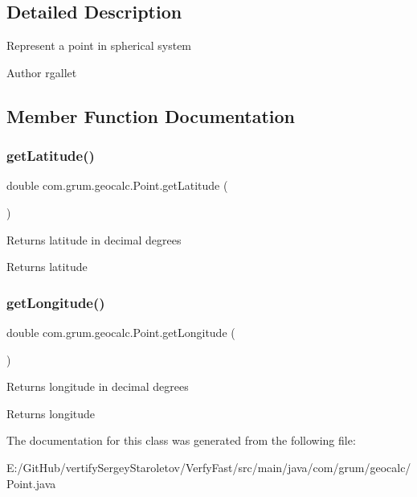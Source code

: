 \subsection{Detailed Description}
Represent a point in spherical system

\begin{DoxyAuthor}{Author}
rgallet 
\end{DoxyAuthor}


\subsection{Member Function Documentation}
\mbox{\label{classcom_1_1grum_1_1geocalc_1_1_point_a0c1dbd62c61a1444ea459122d6a300c7}} 
\subsubsection{\texorpdfstring{get\+Latitude()}{getLatitude()}}
{\footnotesize\ttfamily double com.\+grum.\+geocalc.\+Point.\+get\+Latitude (\begin{DoxyParamCaption}{ }\end{DoxyParamCaption})}

Returns latitude in decimal degrees

\begin{DoxyReturn}{Returns}
latitude 
\end{DoxyReturn}
\mbox{\label{classcom_1_1grum_1_1geocalc_1_1_point_a668b70d0e0d450920eba977d61fbfbf0}} 
\subsubsection{\texorpdfstring{get\+Longitude()}{getLongitude()}}
{\footnotesize\ttfamily double com.\+grum.\+geocalc.\+Point.\+get\+Longitude (\begin{DoxyParamCaption}{ }\end{DoxyParamCaption})}

Returns longitude in decimal degrees

\begin{DoxyReturn}{Returns}
longitude 
\end{DoxyReturn}


The documentation for this class was generated from the following file\+:\begin{DoxyCompactItemize}
\item 
E\+:/\+Git\+Hub/vertify\+Sergey\+Staroletov/\+Verfy\+Fast/src/main/java/com/grum/geocalc/Point.\+java\end{DoxyCompactItemize}
